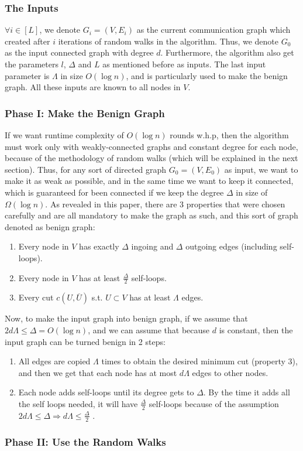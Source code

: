 \documentclass[11pt]{article}
\begin{document}
\subsubsection{The Inputs}
$\forall{i}\in[L]$, we denote $G_{i}=(V,E_{i})$ as the current communication graph which created after $i$ iterations of random walks in the algorithm. Thus, we denote $G_{0}$ as the input connected graph with degree $d$. Furthermore, the algorithm also get the parameters $l$, $\Delta$ and $L$ as mentioned before as inputs. The last input parameter is $\Lambda$ in size $O(\log{n})$, and is particularly used to make the benign graph. All these inputs are known to all nodes in $V$.

\subsubsection{Phase I: Make the Benign Graph}
If we want runtime complexity of $O(\log{n})$ rounds w.h.p, then the algorithm must work only with weakly-connected graphs and constant degree for each node, because of the methodology of random walks (which will be explained in the next section). Thus, for any sort of directed graph $G_{0}=(V,E_{0})$ as input, we want to make it as weak as possible, and in the same time we want to keep it connected, which is guaranteed for been connected if we keep the degree $\Delta$ in size of $\Omega(\log{n})$. As revealed in this paper, there are 3 properties that were chosen carefully and are all mandatory to make the graph as such, and this sort of graph denoted as benign graph:
\begin{enumerate}
  \item Every node in $V$ has exactly $\Delta$ ingoing and $\Delta$ outgoing edges (including self-loops).
  \item Every node in $V$ has at least $\frac{\Delta}{2}$ self-loops.
  \item Every cut $c(U,\overline{U})$ s.t. $U\subset V$ has at least $\Lambda$ edges.
\end{enumerate}
Now, to make the input graph into benign graph, if we assume that $2d\Lambda \leq \Delta = O(\log{n})$, and we can assume that because $d$ is constant, then the input graph can be turned benign in 2 steps:
\begin{enumerate}
  \item All edges are copied $\Lambda$ times to obtain the desired minimum cut (property 3), and then we get that each node has at most $d\Lambda$ edges to other nodes.
  \item Each node adds self-loops until its degree gets to $\Delta$. By the time it adds all the self loops needed, it will have $\frac{\Delta}{2}$ self-loops because of the assumption 
  $2d\Lambda \leq \Delta \Rightarrow d\Lambda \leq \frac{\Delta}{2}$ .
\end{enumerate}

\subsubsection{Phase II: Use the Random Walks}


%
%
\end{document}
